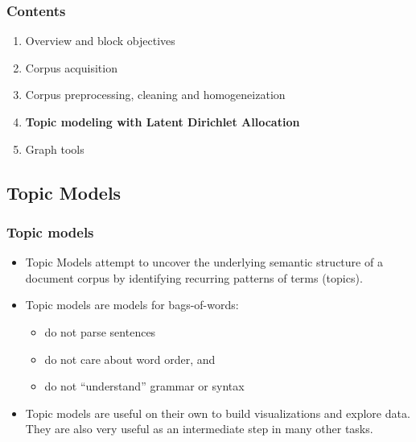 \documentclass{beamer}
\begin{document}
\begin{frame}

    \frametitle{Contents}

	\large

    \begin{enumerate}
  
    	\item Overview and block objectives
    	\item Corpus acquisition
    	\item Corpus preprocessing, cleaning and homogeneization
    	\item {\bf \color{blue}Topic modeling with Latent Dirichlet Allocation}
    	\item Graph tools
    
    \end{enumerate}

\end{frame}


\subsection{Topic Models}

\begin{frame}

    \frametitle{Topic models}

	\large

    \begin{itemize}
  
    	\item Topic Models attempt to uncover the underlying semantic structure of a document corpus by identifying recurring patterns of terms (topics).
    	\item Topic models are models for bags-of-words:
    	\begin{itemize}
			\item do not parse sentences
			\item do not care about word order, and
			\item do not ``understand'' grammar or syntax
		\end{itemize}
		\item Topic models are useful on their own to build visualizations and explore data. They are also very useful as an intermediate step in many other tasks.

    
    \end{itemize}

\end{frame}
\end{document}

